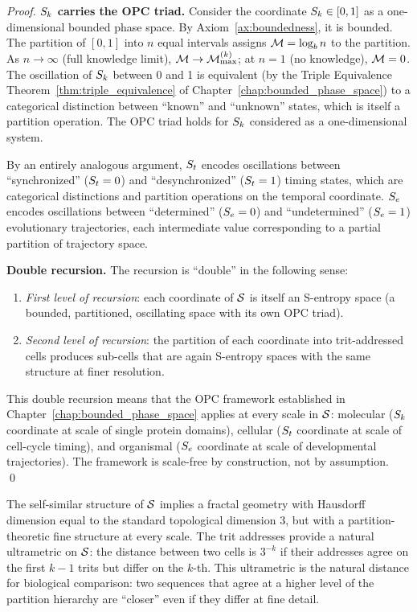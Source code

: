 \begin{proof}
\textbf{$S_k$ carries the OPC triad.}
Consider the coordinate $S_k \in [0,1]$ as a one-dimensional bounded phase
space. By Axiom~\ref{ax:boundedness}, it is bounded. The partition of $[0,1]$
into $n$ equal intervals assigns $\mathcal{M} = \log_b n$ to the partition.
As $n \to \infty$ (full knowledge limit), $\mathcal{M} \to \mathcal{M}_{\max}^{(k)}$;
at $n = 1$ (no knowledge), $\mathcal{M} = 0$. The oscillation of $S_k$ between
0 and 1 is equivalent (by the Triple Equivalence Theorem~\ref{thm:triple_equivalence}
of Chapter~\ref{chap:bounded_phase_space}) to a categorical distinction between
``known'' and ``unknown'' states, which is itself a partition operation. The
OPC triad holds for $S_k$ considered as a one-dimensional system.

By an entirely analogous argument, $S_t$ encodes oscillations between
``synchronized'' ($S_t = 0$) and ``desynchronized'' ($S_t = 1$) timing states,
which are categorical distinctions and partition operations on the temporal
coordinate. $S_e$ encodes oscillations between ``determined'' ($S_e = 0$) and
``undetermined'' ($S_e = 1$) evolutionary trajectories, each intermediate
value corresponding to a partial partition of trajectory space.

\textbf{Double recursion.} The recursion is ``double'' in the following sense:
\begin{enumerate}[label=(\alph*)]
  \item \emph{First level of recursion}: each coordinate of $\mathcal{S}$ is
        itself an S-entropy space (a bounded, partitioned, oscillating space
        with its own OPC triad).
  \item \emph{Second level of recursion}: the partition of each coordinate
        into trit-addressed cells produces sub-cells that are again S-entropy
        spaces with the same structure at finer resolution.
\end{enumerate}
This double recursion means that the OPC framework established in
Chapter~\ref{chap:bounded_phase_space} applies at every scale in $\mathcal{S}$:
molecular ($S_k$ coordinate at scale of single protein domains),
cellular ($S_t$ coordinate at scale of cell-cycle timing), and
organismal ($S_e$ coordinate at scale of developmental trajectories).
The framework is scale-free by construction, not by assumption. \qed
\end{proof}

\begin{remark}
The self-similar structure of $\mathcal{S}$ implies a fractal geometry with
Hausdorff dimension equal to the standard topological dimension 3, but with
a partition-theoretic fine structure at every scale. The trit addresses provide
a natural ultrametric on $\mathcal{S}$: the distance between two cells is $3^{-k}$
if their addresses agree on the first $k-1$ trits but differ on the $k$-th.
This ultrametric is the natural distance for biological comparison: two sequences
that agree at a higher level of the partition hierarchy are ``closer'' even
if they differ at fine detail.
\end{remark}

